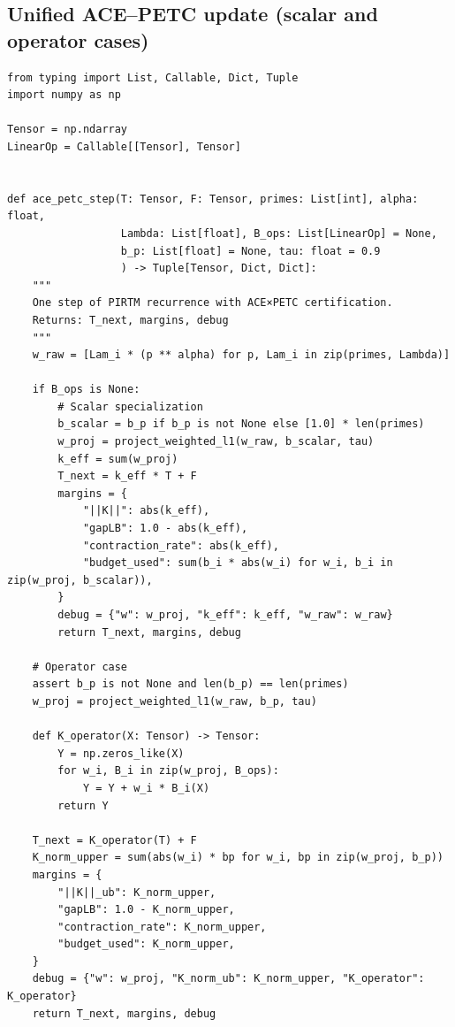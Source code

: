 \documentclass[11pt]{article}
\theoremstyle{plain}
\theoremstyle{definition}
\theoremstyle{remark}
\begin{document}
\subsection{Unified ACE--PETC update (scalar and operator cases)}
\begin{lstlisting}[style=py,caption={One PIRTM step with ACE×PETC certification}]
from typing import List, Callable, Dict, Tuple
import numpy as np

Tensor = np.ndarray
LinearOp = Callable[[Tensor], Tensor]


def ace_petc_step(T: Tensor, F: Tensor, primes: List[int], alpha: float,
                  Lambda: List[float], B_ops: List[LinearOp] = None,
                  b_p: List[float] = None, tau: float = 0.9
                  ) -> Tuple[Tensor, Dict, Dict]:
    """
    One step of PIRTM recurrence with ACE×PETC certification.
    Returns: T_next, margins, debug
    """
    w_raw = [Lam_i * (p ** alpha) for p, Lam_i in zip(primes, Lambda)]

    if B_ops is None:
        # Scalar specialization
        b_scalar = b_p if b_p is not None else [1.0] * len(primes)
        w_proj = project_weighted_l1(w_raw, b_scalar, tau)
        k_eff = sum(w_proj)
        T_next = k_eff * T + F
        margins = {
            "||K||": abs(k_eff),
            "gapLB": 1.0 - abs(k_eff),
            "contraction_rate": abs(k_eff),
            "budget_used": sum(b_i * abs(w_i) for w_i, b_i in zip(w_proj, b_scalar)),
        }
        debug = {"w": w_proj, "k_eff": k_eff, "w_raw": w_raw}
        return T_next, margins, debug

    # Operator case
    assert b_p is not None and len(b_p) == len(primes)
    w_proj = project_weighted_l1(w_raw, b_p, tau)

    def K_operator(X: Tensor) -> Tensor:
        Y = np.zeros_like(X)
        for w_i, B_i in zip(w_proj, B_ops):
            Y = Y + w_i * B_i(X)
        return Y

    T_next = K_operator(T) + F
    K_norm_upper = sum(abs(w_i) * bp for w_i, bp in zip(w_proj, b_p))
    margins = {
        "||K||_ub": K_norm_upper,
        "gapLB": 1.0 - K_norm_upper,
        "contraction_rate": K_norm_upper,
        "budget_used": K_norm_upper,
    }
    debug = {"w": w_proj, "K_norm_ub": K_norm_upper, "K_operator": K_operator}
    return T_next, margins, debug
\end{lstlisting}
\end{document}
